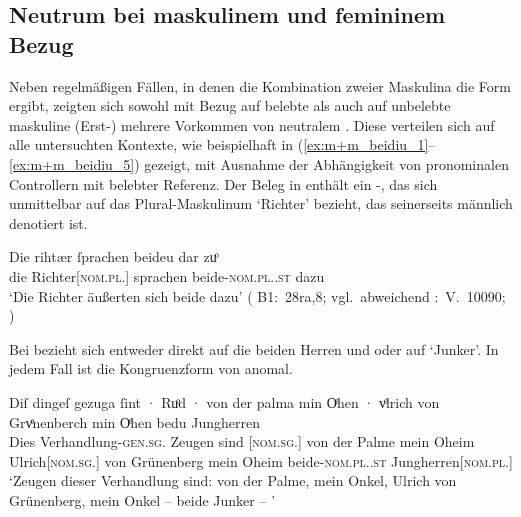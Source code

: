 
\subsection{Neutrum bei maskulinem und femininem Bezug}
\label{subsec:m+m_anim_beidiu}

Neben regelmäßigen Fällen, in denen die Kombination zweier Maskulina die Form
 ergibt, zeigten sich sowohl mit Bezug auf belebte als
auch auf unbelebte maskuline
(Erst-) mehrere Vorkommen von neutralem
. Diese verteilen sich auf alle untersuchten Kontexte, wie
beispielhaft in (\ref{ex:m+m_beidiu_1}--\ref{ex:m+m_beidiu_5}) gezeigt, mit
Ausnahme der Abhängigkeit von pronominalen Controllern mit
belebter Referenz. Der Beleg in  enthält ein
-, das sich unmittelbar auf das Plural-Maskulinum
 `Richter' bezieht, das seinerseits männlich
denotiert ist.

\begin{exe}
\ex \label{ex:m+m_beidiu_1}
	\gll Die rihtær ſprachen beideu {dar zuͦ} \\
		die Richter[\textsc{nom.pl.\MascM}] sprachen
		beide-\textsc{nom.pl.\NeutM.st} dazu \\
	\trans `Die Richter äußerten sich beide dazu'
		(%
			B1:~28ra,8; vgl.~abweichend
			\KC:~V.~10090;
			\cite[267]{schroeder1895}%
		)
\end{exe}

Bei  bezieht sich  entweder direkt auf die
beiden Herren  und 
oder auf  `Junker'. In jedem Fall ist die Kongruenzform von
 anomal.

\begin{exe}
\ex \label{ex:m+m_beidiu_3}
	\gll Diſ dingeſ gezuga ſint · Ruͦd · von der palma min Oͤhen · vͦlrich
			von Grvͤnenberch min Oͤhen bedu Jungherren \textelp{} \\
		Dies Verhandlung-\textsc{gen.sg.\NeutI} Zeugen sind {}
			[\textsc{nom.sg.\MascM}] {} von der Palme mein Oheim
			{} Ulrich[\textsc{nom.sg.\MascM}] von Grünenberg mein Oheim
			beide-\textsc{nom.pl.\NeutM.st}
			Jungherren[\textsc{nom.pl.\MascM}] {} \\
	\trans `Zeugen dieser Verhandlung sind:  von der Palme,
		mein Onkel, Ulrich von Grünenberg, mein Onkel -- beide Junker --
		\textelp{}'
		\parencites(Nr.~2915, Kl.~St.~Urban, Kt.~Luzern, 1298)[213,33--35]{cao4}
\end{exe}

